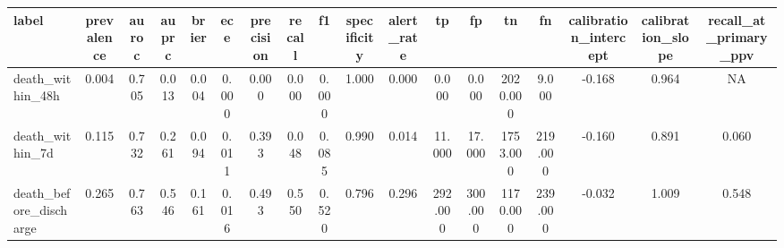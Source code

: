 \begin{tabular}{@{}lccccccccccccccccc@{}}
\toprule
label & prevalence & auroc & auprc & brier & ece & precision & recall & f1 & specificity & alert\_rate & tp & fp & tn & fn & calibration\_intercept & calibration\_slope & recall\_at\_primary\_ppv\\
\midrule
death\_within\_48h & 0.004 & 0.705 & 0.013 & 0.004 & 0.000 & 0.000 & 0.000 & 0.000 & 1.000 & 0.000 & 0.000 & 0.000 & 2020.000 & 9.000 & -0.168 & 0.964 & NA\\
death\_within\_7d & 0.115 & 0.732 & 0.261 & 0.094 & 0.011 & 0.393 & 0.048 & 0.085 & 0.990 & 0.014 & 11.000 & 17.000 & 1753.000 & 219.000 & -0.160 & 0.891 & 0.060\\
death\_before\_discharge & 0.265 & 0.763 & 0.546 & 0.161 & 0.016 & 0.493 & 0.550 & 0.520 & 0.796 & 0.296 & 292.000 & 300.000 & 1170.000 & 239.000 & -0.032 & 1.009 & 0.548\\
\bottomrule
\end{tabular}
